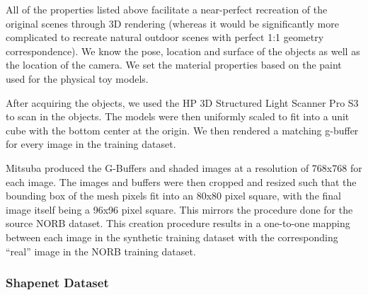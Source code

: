 \documentclass[10pt,twocolumn,letterpaper]{article}
\begin{document}
 All of the properties listed above facilitate a near-perfect recreation of the original scenes through 3D rendering (whereas it would be significantly more complicated to recreate natural outdoor scenes with perfect 1:1 geometry correspondence). We know the pose, location and surface of the objects as well as the location of the camera. We set the material properties based on the paint used for the physical toy models.
 
After acquiring the objects, we used the HP 3D Structured Light Scanner Pro S3\cite{HPSCANNER} to scan in the objects. The models were then uniformly scaled to fit into a unit cube with the bottom center at the origin. We then rendered a matching g-buffer for every image in the training dataset.  

Mitsuba produced the G-Buffers and shaded images at a resolution of 768x768 for each image.  The images and buffers were then cropped and resized such that the bounding box of the mesh pixels fit into an 80x80 pixel square, with the final image itself being a 96x96 pixel square. This mirrors the procedure done for the source NORB dataset. This creation procedure results in a one-to-one mapping between each image in the synthetic training dataset with the corresponding ``real'' image in the NORB training dataset.
\subsubsection{Shapenet Dataset}
\end{document}
